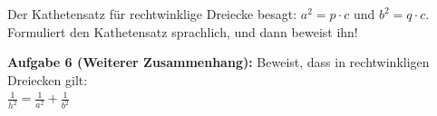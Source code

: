 \documentclass{../cssheet}
\begin{document}
Der Kathetensatz für rechtwinklige Dreiecke besagt: $a^2=p\cdot c$ und $b^2=q\cdot c$. Formuliert den Kathetensatz sprachlich, und dann beweist ihn! 


\textbf{Aufgabe 6 (Weiterer Zusammenhang):} Beweist, dass in rechtwinkligen Dreiecken gilt:\\
\begin{math}\frac{1}{h^2}=\frac{1}{a^2}+\frac{1}{b^2}\end{math}

\vspace*{10mm}
\printlicense

\printsocials


\end{document}
